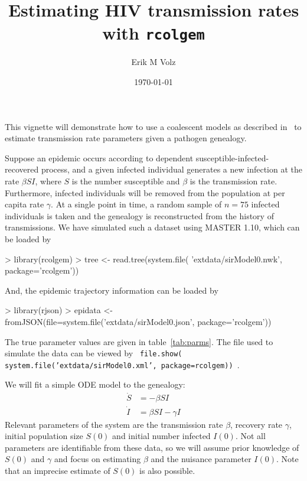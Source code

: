 \documentclass{article}
\begin{document}
\title{Estimating HIV transmission rates with \texttt{rcolgem}}
\author{Erik M Volz}
\date{\today}
\maketitle

This vignette will demonstrate how to use a coalescent models as described in~\cite{volz2012complex} to estimate transmission rate parameters given a pathogen genealogy.

Suppose an epidemic occurs according to dependent susceptible-infected-recovered process, and a given infected individual generates a new infection at the rate $\beta S I$, where $S$ is the number susceptible and $\beta$ is the transmission rate.
Furthermore, infected individuals will be removed from the population at per capita rate $\gamma$. 
At a single point in time, a random sample of $n=75$ infected individuals is taken and the genealogy is reconstructed from the history of transmissions.
We have simulated such a dataset using MASTER 1.10\cite{vaughan2013stochastic}, which can be loaded by
\begin{Schunk}
\begin{Sinput}
> library(rcolgem)
> tree <- read.tree(system.file( 'extdata/sirModel0.nwk', package='rcolgem'))
\end{Sinput}
\end{Schunk}
And, the epidemic trajectory information can be loaded by
\begin{Schunk}
\begin{Sinput}
> library(rjson)
> epidata <- fromJSON(file=system.file('extdata/sirModel0.json', package='rcolgem')) 
\end{Sinput}
\end{Schunk}
The true parameter values are given in table~\ref{tab:parms}.
The file used to simulate the data can be viewed by \texttt{ file.show( system.file('extdata/sirModel0.xml', package=rcolgem)) }. 


We will fit a simple ODE model to the genealogy:
\begin{align}
\dot{S} &= -\beta S I  \\
\dot{I} &= \beta S I - \gamma I
\end{align}
Relevant parameters of the system are the transmission rate $\beta$, recovery rate $\gamma$, initial population size $S(0)$ and initial number infected $I(0)$. 
Not all parameters are identifiable from these data, so we will assume prior knowledge of $S(0)$ and $\gamma$ and focus on estimating $\beta$ and the nuisance parameter $I(0)$. Note that an imprecise estimate of $S(0)$ is also possible. 
\end{document}
